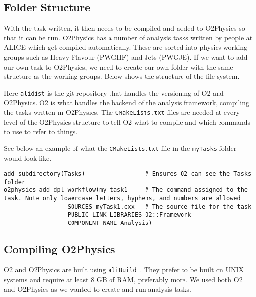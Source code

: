 \subsection{Folder Structure}\label{sec:FolderStructure}
With the task written, it then needs to be compiled and added to O2Physics so that it can be run. O2Physics has a number of analysis tasks written by people at ALICE which get compiled automatically. These are sorted into physics working groups such as Heavy Flavour (PWGHF) and Jets (PWGJE). If we want to add our own task to O2Physics, we need to create our own folder with the same structure as the working groups. Below shows the structure of the file system.

{}
Here \texttt{alidist} is the git repository that handles the versioning of O2 and O2Physics. O2 is what handles the backend of the analysis framework, compiling the tasks written in O2Physics. The \texttt{CMakeLists.txt} files are needed at every level of the O2Physics structure to tell O2 what to compile and which commands to use to refer to things. 

See below an example of what the \texttt{CMakeLists.txt} file in the \texttt{myTasks} folder would look like.

\begin{verbatim}
add_subdirectory(Tasks)                 # Ensures O2 can see the Tasks folder
o2physics_add_dpl_workflow(my-task1     # The command assigned to the task. Note only lowercase letters, hyphens, and numbers are allowed
                  SOURCES myTask1.cxx   # The source file for the task
                  PUBLIC_LINK_LIBRARIES O2::Framework
                  COMPONENT_NAME Analysis)
\end{verbatim}

\subsection{Compiling O2Physics}\label{sec:CompileO2Physics}
O2 and O2Physics are built using \texttt{aliBuild}~\cite{aliBuild_install}. They prefer to be built on UNIX systems and require at least 8 GB of RAM, preferably more. We used both O2 and O2Physics as we wanted to create and run analysis tasks. 

